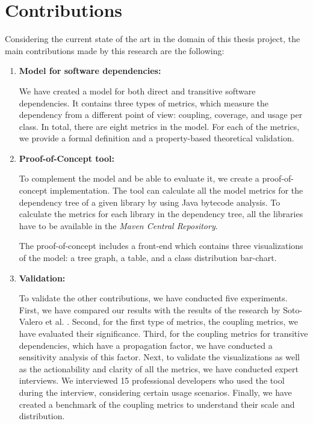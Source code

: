 \section{Contributions}
Considering the current state of the art in the domain of this thesis project, the main contributions made by this research are the following:

\begin{enumerate}
  \item \textbf{Model for software dependencies:}

    We have created a model for both direct and transitive software dependencies. It contains three types of metrics, which measure the dependency from a different point of view: coupling, coverage, and usage per class. In total, there are eight metrics in the model. For each of the metrics, we provide a formal definition and a property-based theoretical validation.

  	\item \textbf{Proof-of-Concept tool:}

    To complement the model and be able to evaluate it, we create a proof-of-concept implementation. The tool can calculate all the model metrics for the dependency tree of a given library by using Java bytecode analysis. To calculate the metrics for each library in the dependency tree, all the libraries have to be available in the \textit{Maven Central Repository}.

    The proof-of-concept includes a front-end which contains three visualizations of the model: a tree graph, a table, and a class distribution bar-chart.

    \item \textbf{Validation:}

    To validate the other contributions, we have conducted five experiments. First, we have compared our results with the results of the research by Soto-Valero et al. \cite{soto2020comprehensive}. Second, for the first type of metrics, the coupling metrics, we have evaluated their significance. Third, for the coupling metrics for transitive dependencies, which have a propagation factor, we have conducted a sensitivity analysis of this factor. Next, to validate the visualizations as well as the actionability and clarity of all the metrics, we have conducted expert interviews. We interviewed 15 professional developers who used the tool during the interview, considering certain usage scenarios. Finally, we have created a benchmark of the coupling metrics to understand their scale and distribution.

\end{enumerate}

